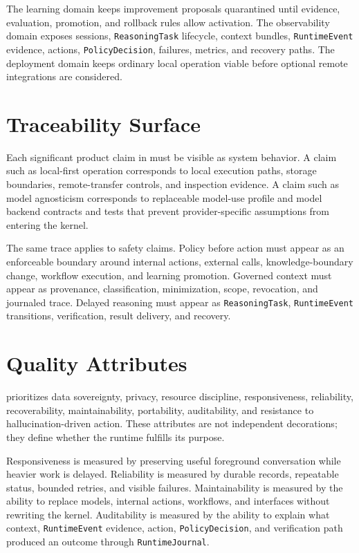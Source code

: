 The learning domain keeps improvement proposals quarantined until evidence, evaluation, promotion, and rollback rules allow activation. The observability domain exposes sessions, \texttt{ReasoningTask} lifecycle, context bundles, \texttt{RuntimeEvent} evidence, actions, \texttt{PolicyDecision}, failures, metrics, and recovery paths.
The deployment domain keeps ordinary local operation viable before optional remote integrations are considered.

\section{Traceability Surface}

Each significant product claim in \Madre must be visible as system behavior. A claim such as local-first operation corresponds to local execution paths, storage boundaries, remote-transfer controls, and inspection evidence. A claim such as model agnosticism corresponds to replaceable model-use profile and model backend contracts and tests that prevent provider-specific assumptions from entering the kernel.

The same trace applies to safety claims. Policy before action must appear as an enforceable boundary around internal actions, external calls, knowledge-boundary change, workflow execution, and learning promotion. Governed context must appear as provenance, classification, minimization, scope, revocation, and journaled trace. Delayed reasoning must appear as \texttt{ReasoningTask}, \texttt{RuntimeEvent} transitions, verification, result delivery, and recovery.

\section{Quality Attributes}

\Madre prioritizes data sovereignty, privacy, resource discipline, responsiveness, reliability, recoverability, maintainability, portability, auditability, and resistance to hallucination-driven action. These attributes are not independent decorations; they define whether the runtime fulfills its purpose.

Responsiveness is measured by preserving useful foreground conversation while heavier work is delayed. Reliability is measured by durable records, repeatable status, bounded retries, and visible failures. Maintainability is measured by the ability to replace models, internal actions, workflows, and interfaces without rewriting the kernel. Auditability is measured by the ability to explain what context, \texttt{RuntimeEvent} evidence, action, \texttt{PolicyDecision}, and verification path produced an outcome through \texttt{RuntimeJournal}.

